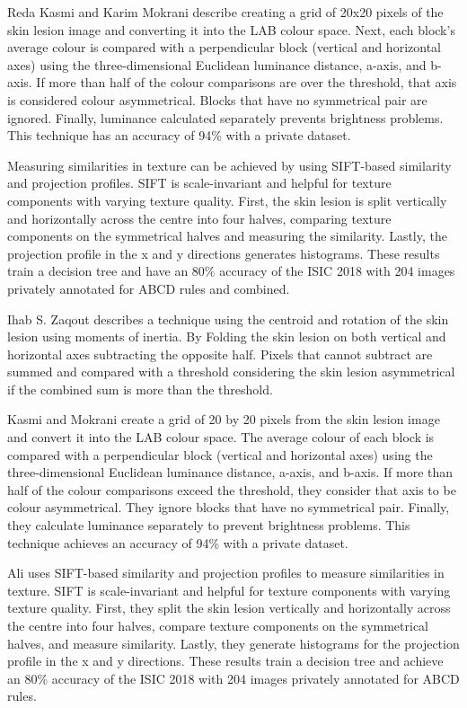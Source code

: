 Reda Kasmi and Karim Mokrani\cite{Kasmi2016} describe creating a grid of 20x20 pixels of the skin lesion image and converting it into the LAB colour space. Next, each block's average colour is compared with a perpendicular block (vertical and horizontal axes) using the three-dimensional Euclidean luminance distance, a-axis, and b-axis. If more than half of the colour comparisons are over the threshold, that axis is considered colour asymmetrical. Blocks that have no symmetrical pair are ignored. Finally, luminance calculated separately prevents brightness problems. This technique has an accuracy of 94\% with a private dataset.

Measuring similarities in texture can be achieved by using SIFT-based similarity and projection profiles\cite{Ali2020a}. SIFT is scale-invariant and helpful for texture components with varying texture quality. First, the skin lesion is split vertically and horizontally across the centre into four halves, comparing texture components on the symmetrical halves and measuring the similarity. Lastly, the projection profile in the x and y directions generates histograms. These results train a decision tree and have an 80\% accuracy of the ISIC 2018 with 204 images privately annotated for ABCD rules and combined.

Ihab S. Zaqout\cite{Zaqout2016} describes a technique using the centroid and rotation of the skin lesion using moments of inertia. By Folding the skin lesion on both vertical and horizontal axes subtracting the opposite half. Pixels that cannot subtract are summed and compared with a threshold considering the skin lesion asymmetrical if the combined sum is more than the threshold.

Kasmi and Mokrani\cite{Kasmi2016} create a grid of 20 by 20 pixels from the skin lesion image and convert it into the LAB colour space. The average colour of each block is compared with a perpendicular block (vertical and horizontal axes) using the three-dimensional Euclidean luminance distance, a-axis, and b-axis. If more than half of the colour comparisons exceed the threshold, they consider that axis to be colour asymmetrical. They ignore blocks that have no symmetrical pair. Finally, they calculate luminance separately to prevent brightness problems. This technique achieves an accuracy of 94\% with a private dataset.

Ali\cite{Ali2020a} uses SIFT-based similarity and projection profiles to measure similarities in texture. SIFT is scale-invariant and helpful for texture components with varying texture quality. First, they split the skin lesion vertically and horizontally across the centre into four halves, compare texture components on the symmetrical halves, and measure similarity. Lastly, they generate histograms for the projection profile in the x and y directions. These results train a decision tree and achieve an 80\% accuracy of the ISIC 2018 with 204 images privately annotated for ABCD rules.

